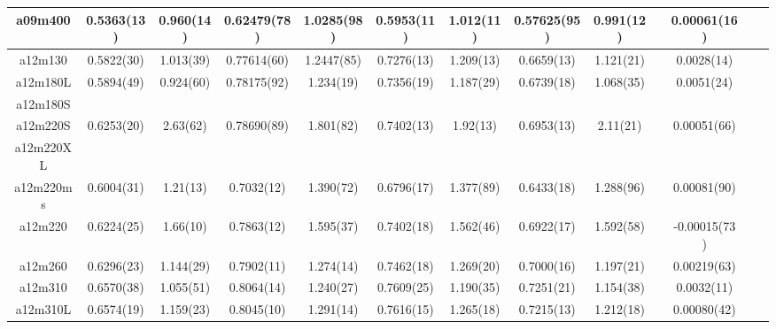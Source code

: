 \documentclass{article}
\begin{document}
\begin{table}[h!]
\begin{tabular}{|| c | c | c | c | c | c | c | c | c | c | c | c | c ||}
 \hline
 a09m400
  & 0.5363(13)   & 0.960(14)    & 0.62479(78)  & 1.0285(98)   & 0.5953(11)   & 1.012(11)    & 0.57625(95)  & 0.991(12)    & {}           & 0.00061(16)  & {}           & {}          \\
 \hline
 a12m130
  & 0.5822(30)   & 1.013(39)    & 0.77614(60)  & 1.2447(85)   & 0.7276(13)   & 1.209(13)    & 0.6659(13)   & 1.121(21)    & {}           & 0.0028(14)   & {}           & {}          \\
 \hline
 a12m180L
  & 0.5894(49)   & 0.924(60)    & 0.78175(92)  & 1.234(19)    & 0.7356(19)   & 1.187(29)    & 0.6739(18)   & 1.068(35)    & {}           & 0.0051(24)   & {}           & {}          \\
 \hline
 a12m180S
  & {}           & {}           & {}           & {}           & {}           & {}           & {}           & {}           & {}           & {}           & {}           & {}          \\
 \hline
 a12m220S
  & 0.6253(20)   & 2.63(62)     & 0.78690(89)  & 1.801(82)    & 0.7402(13)   & 1.92(13)     & 0.6953(13)   & 2.11(21)     & {}           & 0.00051(66)  & {}           & {}          \\
 \hline
 a12m220XL
  & {}           & {}           & {}           & {}           & {}           & {}           & {}           & {}           & {}           & {}           & {}           & {}          \\
 \hline
 a12m220ms
  & 0.6004(31)   & 1.21(13)     & 0.7032(12)   & 1.390(72)    & 0.6796(17)   & 1.377(89)    & 0.6433(18)   & 1.288(96)    & {}           & 0.00081(90)  & {}           & {}          \\
 \hline
 a12m220
  & 0.6224(25)   & 1.66(10)     & 0.7863(12)   & 1.595(37)    & 0.7402(18)   & 1.562(46)    & 0.6922(17)   & 1.592(58)    & {}           & -0.00015(73) & {}           & {}          \\
 \hline
 a12m260
  & 0.6296(23)   & 1.144(29)    & 0.7902(11)   & 1.274(14)    & 0.7462(18)   & 1.269(20)    & 0.7000(16)   & 1.197(21)    & {}           & 0.00219(63)  & {}           & {}          \\
 \hline
 a12m310
  & 0.6570(38)   & 1.055(51)    & 0.8064(14)   & 1.240(27)    & 0.7609(25)   & 1.190(35)    & 0.7251(21)   & 1.154(38)    & {}           & 0.0032(11)   & {}           & {}          \\
 \hline
 a12m310L
  & 0.6574(19)   & 1.159(23)    & 0.8045(10)   & 1.291(14)    & 0.7616(15)   & 1.265(18)    & 0.7215(13)   & 1.212(18)    & {}           & 0.00080(42)  & {}           & {}          \\

\end{tabular}
\end{table}
\end{document}
